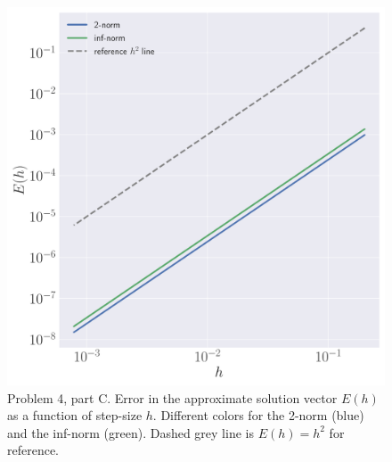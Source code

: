 \documentclass[12pt]{article}
\begin{document}
\begin{figure}[!h]
    \centering
    \includegraphics[clip, scale=0.40]{q4c_fig.pdf}
    \caption{
        Problem 4, part C. Error in the approximate solution vector $E(h)$ as a function of step-size $h$. Different colors for the 2-norm (blue) and the inf-norm (green). Dashed grey line is $E(h) = h^{2}$ for reference.
    }
\end{figure}
\end{document}

